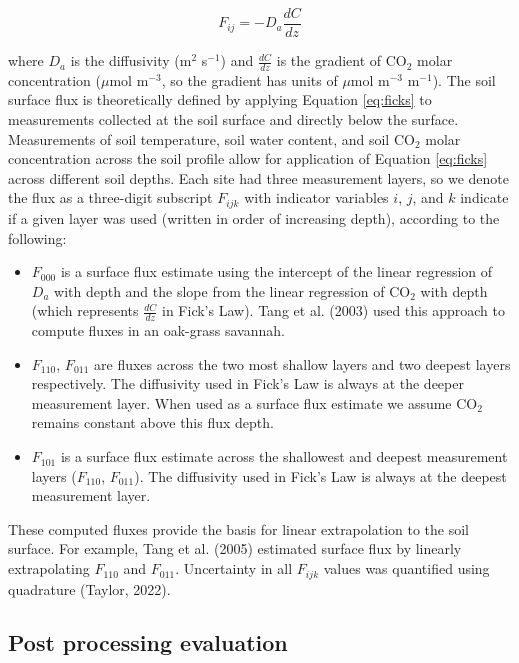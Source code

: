 \documentclass[
  letterpaper,
  DIV=11,
  numbers=noendperiod]{scrartcl}
\providecommand{\tightlist}{%
  \setlength{\itemsep}{0pt}\setlength{\parskip}{0pt}}\usepackage{longtable,booktabs,array}
\begin{document}
\begin{equation}
  F_{ij} = -D_{a} \frac{dC}{dz}
  \label{eq:ficks}
\end{equation}

where \(D_{a}\) is the diffusivity (m\(^{2}\) s\(^{-1}\)) and
\(\frac{dC}{dz}\) is the gradient of CO\(_{2}\) molar concentration
(\(\mu\)mol m\(^{-3}\), so the gradient has units of \(\mu\)mol
m\(^{-3}\) m\(^{-1}\)). The soil surface flux is theoretically defined
by applying Equation \ref{eq:ficks} to measurements collected at the
soil surface and directly below the surface. Measurements of soil
temperature, soil water content, and soil CO\(_{2}\) molar concentration
across the soil profile allow for application of Equation \ref{eq:ficks}
across different soil depths. Each site had three measurement layers, so
we denote the flux as a three-digit subscript \(F_{ijk}\) with indicator
variables \(i\), \(j\), and \(k\) indicate if a given layer was used
(written in order of increasing depth), according to the following:

\begin{itemize}
\tightlist
\item
  \(F_{000}\) is a surface flux estimate using the intercept of the
  linear regression of \(D_{a}\) with depth and the slope from the
  linear regression of CO\(_{2}\) with depth (which represents
  \(\displaystyle \frac{dC}{dz}\) in Fick's Law). Tang et al. (2003)
  used this approach to compute fluxes in an oak-grass savannah.
\item
  \(F_{110}\), \(F_{011}\) are fluxes across the two most shallow layers
  and two deepest layers respectively. The diffusivity used in Fick's
  Law is always at the deeper measurement layer. When used as a surface
  flux estimate we assume CO\(_{2}\) remains constant above this flux
  depth.
\item
  \(F_{101}\) is a surface flux estimate across the shallowest and
  deepest measurement layers (\(F_{110}\), \(F_{011}\)). The diffusivity
  used in Fick's Law is always at the deepest measurement layer.
\end{itemize}

These computed fluxes provide the basis for linear extrapolation to the
soil surface. For example, Tang et al. (2005) estimated surface flux by
linearly extrapolating \(F_{110}\) and \(F_{011}\). Uncertainty in all
\(F_{ijk}\) values was quantified using quadrature (Taylor, 2022).

\subsection{Post processing evaluation}\label{sec-post-process}
\end{document}
